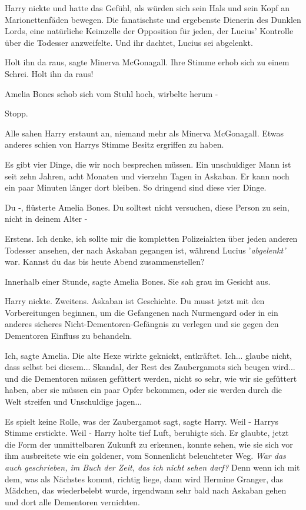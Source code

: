 Harry nickte und hatte das Gefühl, als würden sich sein Hals und sein Kopf an
Marionettenfäden bewegen. \glqq{}Die fanatischste und ergebenste Dienerin des
Dunklen Lords, eine natürliche Keimzelle der Opposition für jeden, der Lucius'
Kontrolle über die Todesser anzweifelte. Und ihr dachtet, Lucius sei abgelenkt.\grqq{}

\glqq{}Holt ihn da raus\grqq{}, sagte Minerva McGonagall. Ihre Stimme erhob sich
zu einem Schrei. \glqq{}Holt ihn da raus!\grqq{}

Amelia Bones schob sich vom Stuhl hoch, wirbelte herum -

\glqq{}Stopp.\grqq{}

Alle sahen Harry erstaunt an, niemand mehr als Minerva McGonagall. Etwas anderes
schien von Harrys Stimme Besitz ergriffen zu haben.

\glqq{}Es gibt vier Dinge, die wir noch besprechen müssen. Ein unschuldiger Mann
ist seit zehn Jahren, acht Monaten und vierzehn Tagen in Askaban. Er kann noch
ein paar Minuten länger dort bleiben. So dringend sind diese vier Dinge.\grqq{}

\glqq{}Du -\grqq{}, flüsterte Amelia Bones. \glqq{}Du solltest nicht versuchen,
diese Person zu sein, nicht in deinem Alter -\grqq{}

\glqq{}Erstens. Ich denke, ich sollte mir die kompletten Polizeiakten über jeden
anderen Todesser ansehen, der nach Askaban gegangen ist, während Lucius
'\emph{abgelenkt'} war. Kannst du das bis heute Abend zusammenstellen?\grqq{}

\glqq{}Innerhalb einer Stunde\grqq{}, sagte Amelia Bones. Sie sah grau im Gesicht
aus.

Harry nickte. \glqq{}Zweitens. Askaban ist Geschichte. Du musst jetzt mit den
Vorbereitungen beginnen, um die Gefangenen nach Nurmengard oder in ein anderes
sicheres Nicht-Dementoren-Gefängnis zu verlegen und sie gegen den Dementoren
Einfluss zu behandeln.\grqq{}

\glqq{}Ich\grqq{}, sagte Amelia. Die alte Hexe wirkte geknickt, entkräftet. \glqq{}
Ich... glaube nicht, dass selbst bei diesem... Skandal, der Rest des
Zaubergamots sich beugen wird... und die Dementoren müssen gefüttert werden,
nicht so sehr, wie wir sie gefüttert haben, aber sie müssen ein paar Opfer
bekommen, oder sie werden durch die Welt streifen und Unschuldige jagen...\grqq{}

\glqq{}Es spielt keine Rolle, was der Zaubergamot sagt\grqq{}, sagte Harry. \glqq{}
Weil -\grqq{} Harrys Stimme erstickte. \glqq{}Weil -\grqq{} Harry holte tief Luft, beruhigte
sich. Er glaubte, jetzt die Form der unmittelbaren Zukunft zu erkennen, konnte
sehen, wie sie sich vor ihm ausbreitete wie ein goldener, vom Sonnenlicht
beleuchteter Weg.
\emph{War das auch geschrieben, im Buch der Zeit, das ich nicht sehen darf?}
\glqq{}Denn wenn ich mit dem, was als Nächstes kommt, richtig liege, dann wird
Hermine Granger, das Mädchen, das wiederbelebt wurde, irgendwann sehr bald nach
Askaban gehen und dort alle Dementoren vernichten.\grqq{}

